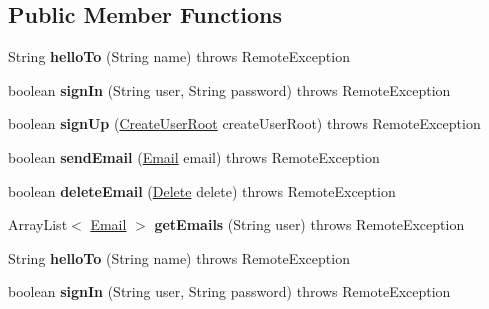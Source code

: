\subsection*{Public Member Functions}
\begin{DoxyCompactItemize}
\item 
\mbox{\label{interface_r_m_i_interface_a44a3680b28462fce581d362dbc6cf1db}} 
String {\bfseries hello\+To} (String name)  throws Remote\+Exception
\item 
\mbox{\label{interface_r_m_i_interface_a826db0ba8f0814985cfa911ef76a68cc}} 
boolean {\bfseries sign\+In} (String user, String password)  throws Remote\+Exception
\item 
\mbox{\label{interface_r_m_i_interface_a39fbf15bb1115837ce6025aaa47784bb}} 
boolean {\bfseries sign\+Up} (\hyperlink{class_create_user_root}{Create\+User\+Root} create\+User\+Root)  throws Remote\+Exception
\item 
\mbox{\label{interface_r_m_i_interface_ad86e01382cdb0cb8a64710a7e9102524}} 
boolean {\bfseries send\+Email} (\hyperlink{class_email}{Email} email)  throws Remote\+Exception
\item 
\mbox{\label{interface_r_m_i_interface_a86bc2a5cb0bdb04a1aeb9b36e373cd5e}} 
boolean {\bfseries delete\+Email} (\hyperlink{class_delete}{Delete} delete)  throws Remote\+Exception
\item 
\mbox{\label{interface_r_m_i_interface_ad326010c8c132dd3398a4443cf827601}} 
Array\+List$<$ \hyperlink{class_email}{Email} $>$ {\bfseries get\+Emails} (String user)  throws Remote\+Exception
\item 
\mbox{\label{interface_r_m_i_interface_a44a3680b28462fce581d362dbc6cf1db}} 
String {\bfseries hello\+To} (String name)  throws Remote\+Exception
\item 
\mbox{\label{interface_r_m_i_interface_a826db0ba8f0814985cfa911ef76a68cc}} 
boolean {\bfseries sign\+In} (String user, String password)  throws Remote\+Exception
\item 

\end{DoxyCompactItemize}
